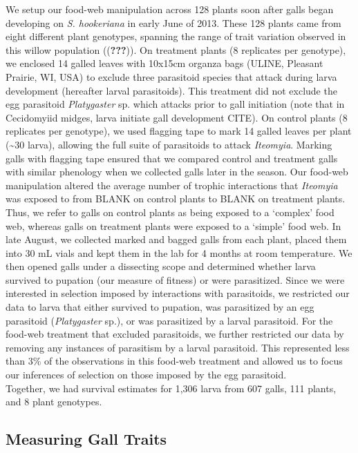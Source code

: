 \documentclass[]{elsarticle} %
\begin{document}
We setup our food-web manipulation across 128 plants soon after galls
began developing on \emph{S. hookeriana} in early June of 2013. These
128 plants came from eight different plant genotypes, spanning the range
of trait variation observed in this willow population
(({\textbf{???}})). On treatment plants (8 replicates per genotype), we
enclosed 14 galled leaves with 10x15cm organza bags (ULINE, Pleasant
Prairie, WI, USA) to exclude three parasitoid species that attack during
larva development (hereafter larval parasitoids). This treatment did not
exclude the egg parasitoid \emph{Platygaster} sp. which attacks prior to
gall initiation (note that in Cecidomyiid midges, larva initiate gall
development CITE). On control plants (8 replicates per genotype), we
used flagging tape to mark 14 galled leaves per plant
(\textasciitilde{}30 larva), allowing the full suite of parasitoids to
attack \emph{Iteomyia}. Marking galls with flagging tape ensured that we
compared control and treatment galls with similar phenology when we
collected galls later in the season. Our food-web manipulation altered
the average number of trophic interactions that \emph{Iteomyia} was
exposed to from BLANK on control plants to BLANK on treatment plants.
Thus, we refer to galls on control plants as being exposed to a
`complex' food web, whereas galls on treatment plants were exposed to a
`simple' food web. In late August, we collected marked and bagged galls
from each plant, placed them into 30 mL vials and kept them in the lab
for 4 months at room temperature. We then opened galls under a
dissecting scope and determined whether larva survived to pupation (our
measure of fitness) or were parasitized. Since we were interested in
selection imposed by interactions with parasitoids, we restricted our
data to larva that either survived to pupation, was parasitized by an
egg parasitoid (\emph{Platygaster} sp.), or was parasitized by a larval
parasitoid. For the food-web treatment that excluded parasitoids, we
further restricted our data by removing any instances of parasitism by a
larval parasitoid. This represented less than 3\% of the observations in
this food-web treatment and allowed us to focus our inferences of
selection on those imposed by the egg parasitoid.\\
Together, we had survival estimates for 1,306 larva from 607 galls, 111
plants, and 8 plant genotypes.

\subsection{Measuring Gall Traits}\label{measuring-gall-traits}
\end{document}

